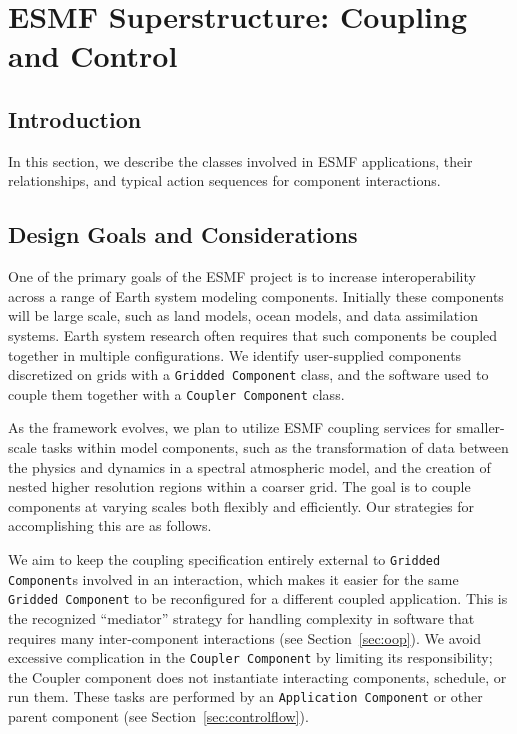 \section{ESMF Superstructure:  Coupling and Control}
\label{sec:superclasses}

\subsection{Introduction}

In this section, we describe the classes involved in ESMF applications, 
their relationships, and typical action sequences for component interactions.  

\subsection{Design Goals and Considerations}

One of the primary goals of the ESMF project is to increase interoperability
across a range of Earth system modeling components.  Initially these 
components will be large scale, such as land models, ocean models, 
and data assimilation systems.  Earth system research 
often requires that such components be coupled together in multiple
configurations.  We identify user-supplied components discretized on grids with 
a {\tt Gridded Component} class, and the software used to couple them together
with a {\tt Coupler Component} class.  

As the framework evolves, we plan to utilize ESMF coupling services for 
smaller-scale tasks within model components, such as the transformation of 
data between the 
physics and dynamics in a spectral atmospheric model, and the creation 
of nested higher resolution regions within a coarser grid.  The goal is 
to couple components at varying scales both flexibly and efficiently.  
Our strategies for accomplishing this are as follows.

We aim to keep the coupling specification entirely external 
to {\tt Gridded Component}s involved in an interaction, which makes it easier 
for the same {\tt Gridded Component} to be reconfigured for a different 
coupled application.
This is the recognized ``mediator'' strategy for handling complexity in 
software that requires many inter-component interactions (see Section~\ref{sec:oop}).  
We avoid excessive complication in the {\tt Coupler Component} by limiting
its responsibility; the Coupler component does not instantiate 
interacting components, schedule, or run them.  These tasks are performed
by an {\tt Application Component} or other parent component (see 
Section~\ref{sec:controlflow}).

